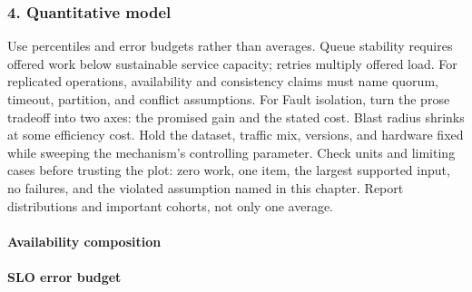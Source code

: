 \subsubsection*{4. Quantitative model}
Use percentiles and error budgets rather than averages. Queue stability requires offered work below sustainable service capacity; retries multiply offered load. For replicated operations, availability and consistency claims must name quorum, timeout, partition, and conflict assumptions.
For Fault isolation, turn the prose tradeoff into two axes: the promised gain and the stated cost. Blast radius shrinks at some efficiency cost. Hold the dataset, traffic mix, versions, and hardware fixed while sweeping the mechanism's controlling parameter.
Check units and limiting cases before trusting the plot: zero work, one item, the largest supported input, no failures, and the violated assumption named in this chapter. Report distributions and important cohorts, not only one average.
\paragraph{Availability composition}
\paragraph{SLO error budget}
